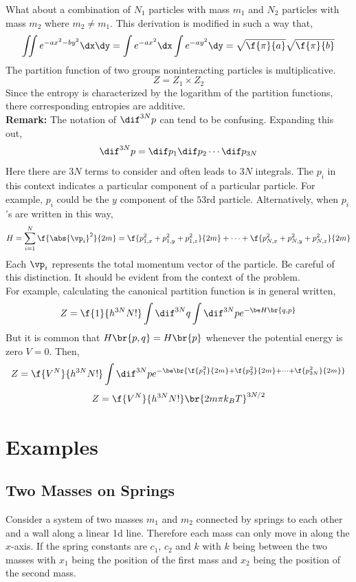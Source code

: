 \documentclass{article}
\begin{document}
What about a combination of $N_1$ particles with mass $m_1$ and $N_2$ particles with mass $m_2$ where $m_2 \neq m_1$. This derivation is modified in such a way that,
\[ \iint e^{-ax^2 - by^2}\dx\dy = \int e^{-ax^2}\dx\int e^{-ay^2}\dy = \sqrt{\f{\pi}{a}}\sqrt{\f{\pi}{b}}\]
The partition function of two groups noninteracting particles is multiplicative.
\[ Z = Z_1 \times Z_2 \]
Since the entropy is characterized by the logarithm of the partition functions, there corresponding entropies are additive.\\

\textbf{Remark:} The notation of $\dif^{3N} p$ can tend to be confusing. Expanding this out,
\[ \dif^{3N} p = \dif p_1 \dif p_2 \cdots \dif p_{3N}  \]
Here there are $3N$ terms to consider and often leads to $3N$ integrals. The $p_i$ in this context indicates a particular component of a particular particle. For example, $p_i$ could be the $y$ component of the $53$rd particle. Alternatively, when $p_i$'s are written in this way,
\[ H = \sum_{i=1}^N \f{\abs{\vp_i}^2}{2m} = \f{p_{1,x}^2 + p_{1,y}^2 + p_{1,z}^2}{2m} + \cdots + \f{p_{N,x}^2 + p_{N,y}^2 + p_{N,z}^2}{2m} \]
Each $\vp_i$ represents the total momentum vector of the particle. Be careful of this distinction. It should be evident from the context of the problem. \\

For example, calculating the canonical partition function is in general written,
\[ Z = \f{1}{h^{3N} N!} \int \dif^{3N}q\int \dif^{3N}p e^{-\be H\br{q,p}} \]
But it is common that $H\br{p,q} = H\br{p}$ whenever the potential energy is zero $V = 0$. Then,
\[ Z = \f{V^{N}}{h^{3N} N!} \int \dif^{3N}p e^{-\be \br{\f{p_1^2}{2m} + \f{p_2^2}{2m} + \cdots + \f{p_{3N}^2}{2m}}} \]
\[ Z = \f{V^{N}}{h^{3N} N!} \br{2m\pi k_B T}^{3N/2} \]

\section{Examples}

\subsection{Two Masses on Springs}
Consider a system of two masses $m_1$ and $m_2$ connected by springs to each other and a wall along a linear 1d line. Therefore each mass can only move in along the $x$-axis. If the spring constants are $c_1$, $c_2$ and $k$ with $k$ being between the two masses with $x_1$ being the position of the first mass and $x_2$ being the position of the second mass.
\end{document}
